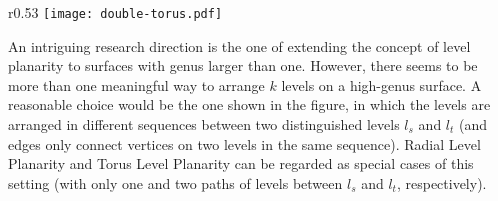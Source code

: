 \documentclass{llncs}
\begin{document}
\begin{wrapfigure}[5]{r}{0.53\textwidth}
  \vspace{-20pt}
  \centering
\texttt{[image: double-torus.pdf]}
\label{fig:double-torus}
\end{wrapfigure}

An intriguing research direction is the one of extending the concept of level planarity to surfaces with genus larger than one. 
However, there seems to be more than one meaningful way to arrange $k$ levels on a high-genus surface.
A reasonable choice would be the one shown in the figure, in which the levels are arranged in different sequences between two distinguished levels $l_s$ and $l_t$ (and edges only connect vertices on two levels in the same sequence). 
{\sc Radial Level Planarity} and {\sc Torus Level Planarity} can be regarded as special cases of this setting (with only one and two paths of levels between $l_s$ and $l_t$, respectively). 






\end{document}
